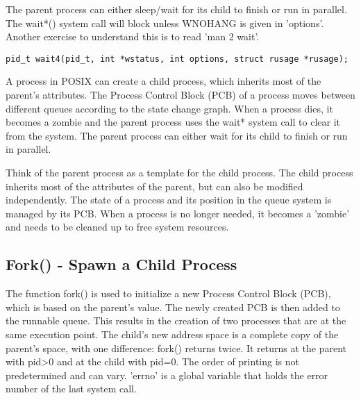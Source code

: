 \documentclass[12pt]{report}
\begin{document}
The parent process can either sleep/wait for its child to finish or run in parallel. The wait*() system call will block unless WNOHANG is given in 'options'. Another exercise to understand this is to read 'man 2 wait'.
\begin{lstlisting}
pid_t wait4(pid_t, int *wstatus, int options, struct rusage *rusage);
\end{lstlisting}
\begin{tcolorbox}[colback=yellow!5, colframe=yellow!80!black, title={\faBookmark À retenir}]
A process in POSIX can create a child process, which inherits most of the parent's attributes. The Process Control Block (PCB) of a process moves between different queues according to the state change graph. When a process dies, it becomes a zombie and the parent process uses the wait* system call to clear it from the system. The parent process can either wait for its child to finish or run in parallel.
\end{tcolorbox}
\begin{tcolorbox}[colback=green!5, colframe=green!75!black, title={\faLightbulb Intuition}]
Think of the parent process as a template for the child process. The child process inherits most of the attributes of the parent, but can also be modified independently. The state of a process and its position in the queue system is managed by its PCB. When a process is no longer needed, it becomes a 'zombie' and needs to be cleaned up to free system resources.
\end{tcolorbox}

\subsection*{Fork() - Spawn a Child Process}

The function fork() is used to initialize a new Process Control Block (PCB), which is based on the parent's value. The newly created PCB is then added to the runnable queue. This results in the creation of two processes that are at the same execution point. The child's new address space is a complete copy of the parent's space, with one difference: fork() returns twice. It returns at the parent with pid>0 and at the child with pid=0. The order of printing is not predetermined and can vary. 'errno' is a global variable that holds the error number of the last system call.
\end{document}
